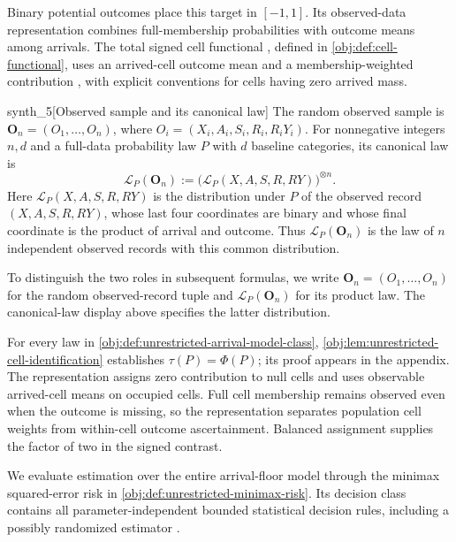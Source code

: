 Binary potential outcomes place this target in \([-1,1]\). Its observed-data representation combines full-membership probabilities with outcome means among arrivals. The total signed cell functional , defined in \cref{obj:def:cell-functional}, uses an arrived-cell outcome mean  and a membership-weighted contribution , with explicit conventions for cells having zero arrived mass.

\begin{definitionv}{synth_5}[Observed sample and its canonical law]
The random observed sample is \(\mathbf O_n=(O_1,\ldots,O_n)\), where \(O_i=(X_i,A_i,S_i,R_i,R_iY_i)\). For nonnegative integers \(n,d\) and a full-data probability law \(P\) with \(d\) baseline categories, its canonical law is
\[
\mathcal L_P(\mathbf O_n):=\bigl(\mathcal L_P(X,A,S,R,RY)\bigr)^{\otimes n}.
\]
Here \(\mathcal L_P(X,A,S,R,RY)\) is the distribution under \(P\) of the observed record \((X,A,S,R,RY)\), whose last four coordinates are binary and whose final coordinate is the product of arrival and outcome. Thus \(\mathcal L_P(\mathbf O_n)\) is the law of \(n\) independent observed records with this common distribution.
\end{definitionv}

To distinguish the two roles in subsequent formulas, we write \(\mathbf O_n=(O_1,\ldots,O_n)\) for the random observed-record tuple and \(\mathcal L_P(\mathbf O_n)\) for its product law. The canonical-law display above specifies the latter distribution.

For every law in \cref{obj:def:unrestricted-arrival-model-class}, \cref{obj:lem:unrestricted-cell-identification} establishes \(\tau(P)=\Phi(P)\); its proof appears in the appendix. The representation assigns zero contribution to null cells and uses observable arrived-cell means on occupied cells. Full cell membership remains observed even when the outcome is missing, so the representation separates population cell weights from within-cell outcome ascertainment. Balanced assignment supplies the factor of two in the signed contrast.

We evaluate estimation over the entire arrival-floor model through the minimax squared-error risk  in \cref{obj:def:unrestricted-minimax-risk}. Its decision class  contains all parameter-independent bounded statistical decision rules, including a possibly randomized estimator .

